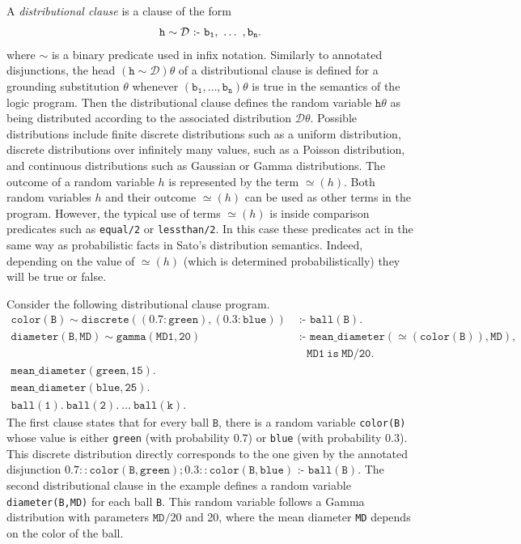 \documentclass[a4paper]{article}
\newcommand{\coloneq}{\mbox{ :- }}
\newcommand{\val}{\ensuremath{\simeq\!\!}}
\begin{document}
A \emph{distributional clause} is a clause of the form 
\begin{eqnarray*}
\mathtt{h} \sim {\cal D}  \coloneq \mathtt{b_1,\ \ldots\ ,b_n.} 
\end{eqnarray*}
where $\sim$ is a binary predicate used in infix notation. 
Similarly to annotated disjunctions, the head $ (\mathtt{h}\sim \mathcal{D})\theta$  of a distributional clause
is defined for a grounding substitution $\theta$ whenever $(\mathtt{b_1,\ldots,b_n})\theta$ is true in the semantics of the logic program.  
Then the distributional clause defines the random variable 
$\mathtt{h}\theta$ as being distributed according to the associated
distribution $\mathcal{D}\theta$. Possible distributions include
finite discrete distributions such as a uniform distribution, discrete
distributions over infinitely many values, such as a Poisson
distribution,  and continuous distributions such as Gaussian or Gamma
distributions. The outcome of a random variable $h$ is represented by
the term $\val(h)$. 
Both random variables $h$ and their outcome $\val(h)$ can be used as other terms 
in the program. However, the typical use of  terms $\val(h)$ is inside
comparison predicates such as \texttt{equal/2} or
\texttt{lessthan/2}. 
In this case these predicates act in the same way as probabilistic facts in Sato's distribution semantics. 
Indeed, depending on the value of $\val(h)$ (which is determined
probabilistically) they will be true or false. 



Consider the following distributional clause program. 
\begin{align*}
 \mathtt{color(B) \sim discrete((0.7:green),(0.3:blue))} 
         &\coloneq \mathtt{ball(B).}\\  
 \mathtt{diameter(B,MD)\sim gamma(MD1,20) }
         &\mathtt{\coloneq mean\_diameter(\val(color(B)),MD), }\\
& \mathtt{\quad MD1 ~ is ~ MD/20.}\\
    \mathtt{mean\_diameter(green,15).}&\\
    \mathtt{mean\_diameter(blue,25).}&\\
    \mathtt{ball(1). ~ball(2). ~ \ldots ~ ball(k).}&
  \end{align*}
The first clause states that for every ball $\mathtt{B}$, there is a random
variable \verb|color(B)| whose value is either \verb|green| (with
probability $0.7$) or \verb|blue| (with probability $0.3$). This
discrete distribution directly corresponds to the one given by the
annotated disjunction $
\mathtt{0.7::color(B,green); 0.3::color(B,blue)} 
         \coloneq \mathtt{ball(B).}$
The second distributional clause in the example defines a random
variable \verb|diameter(B,MD)| for each ball \verb|B|. This random variable follows a Gamma distribution 
with parameters $\mathtt{MD}/20$ and 20, where the mean diameter
\verb|MD| depends on the color of the ball. 
\end{document}
